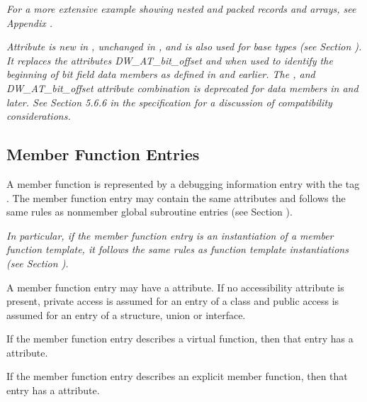 \textit{For a more extensive example showing nested and packed records
and arrays, see 
Appendix .}

\textit{Attribute \DWATdatabitoffset{} 
is new in 
, unchanged in \DWARFVersionV,
and is also used for base types 
(see Section 
). 
It replaces the attributes 
DW\_AT\_bit\_offset
and \DWATbytesize{} when used to
identify the beginning of bit field data members as defined
in \DWARFVersionIII{} and earlier. The 
\DWATbytesize, 
\DWATbitsize{} and 
DW\_AT\_bit\_offset
attribute combination is deprecated for data members in 
\DWARFVersionIV{} and later. See Section 5.6.6 in the \DWARFVersionIV{}
specification for a discussion of compatibility considerations.}

\subsection{Member Function Entries}
\label{chap:memberfunctionentries}

A member function is represented by a 
debugging information entry 
with the 
tag \DWTAGsubprogram.
The member function entry
may contain the same attributes and follows the same rules
as non\dash member global subroutine entries 
(see Section ).

\textit{In particular, if the member function entry is an
instantiation of a member function template, it follows the 
same rules as function template instantiations (see Section 
).
}

A 
member function entry may have a 
\DWATaccessibility{}
attribute. If no accessibility attribute is present, private
access is assumed for an entry of a class and public access
is assumed for an entry of a structure, union or interface.

If 
\hypertarget{chap:DWATvirtualityvirtualityoffunction}{}
the member function entry describes a virtual function,
then that entry has a 
\DWATvirtuality{} attribute.

If 
\hypertarget{chap:DWATexplicitexplicitpropertyofmemberfunction}{}
the member function entry describes an explicit member
function, then that entry has 
a 
\DWATexplicit{} attribute.

